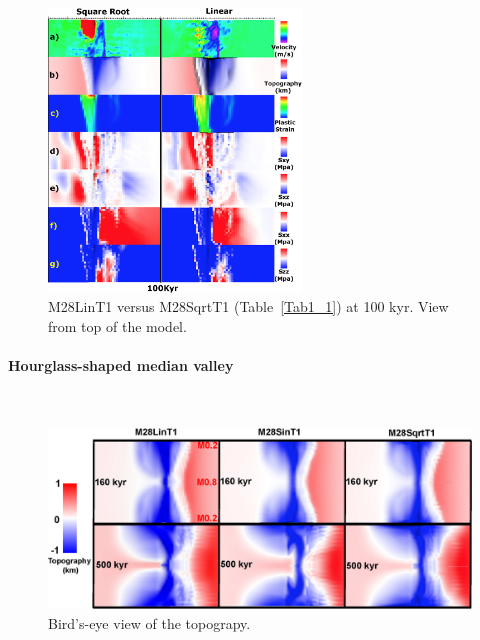 \begin{figure}[h]
  \centering
    \includegraphics[width=0.6\textwidth]{./Figures/fig_Results4_3_sqrt_vs_lin_cut_back_100kyr.eps}
  \caption{M28LinT1 versus M28SqrtT1 (Table~\hyperref[Tab1_1]{\ref{Tab1_1}}) at 100 kyr. View from top of the model.}
 \label{fig_Results4_3_2}
\end{figure} 
\fi

\paragraph{Hourglass-shaped median valley}
~\\
\begin{figure}[h]
  \centering
    \includegraphics[width=1.0\textwidth]{./Figures/fig_Results_3_3_1_hourglass.eps}
  \caption{Bird's-eye view of the topograpy.  }
 \label{fig_Results_3_3_1_hourglass}
\end{figure} 

